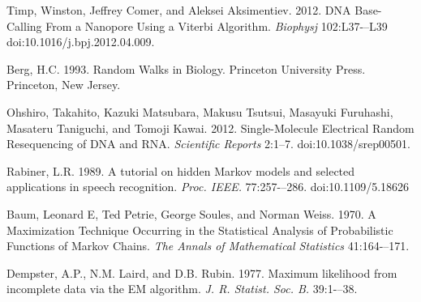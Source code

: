 \documentclass{biophys_letter}
\begin{document}
\begin{thebibliography}{99}
  Timp, Winston, Jeffrey Comer, and Aleksei Aksimentiev. 
  2012.
  DNA Base-Calling From a Nanopore Using a Viterbi Algorithm.
  {\it Biophysj}
  102:L37-–L39
  doi:10.1016/j.bpj.2012.04.009.

  Berg, H.C.
  1993.
  Random Walks in Biology.
  Princeton University Press.
  Princeton, New Jersey.

  Ohshiro, Takahito, Kazuki Matsubara, Makusu Tsutsui, Masayuki Furuhashi, Masateru Taniguchi, and Tomoji Kawai. 
  2012.
  Single-Molecule Electrical Random Resequencing of DNA and RNA.
  {\it Scientific Reports} 
  2:1--7.
  doi:10.1038/srep00501.

  Rabiner, L.R.
  1989.
  A tutorial on hidden Markov models and selected applications in speech recognition.
  {\it Proc. IEEE.}
  77:257-–286.
  doi:10.1109/5.18626

  Baum, Leonard E, Ted Petrie, George Soules, and Norman Weiss. 
  1970.
  A Maximization Technique Occurring in the Statistical Analysis of Probabilistic Functions of Markov Chains.
  {\it The Annals of Mathematical Statistics}
  41:164-–171.

  Dempster, A.P., N.M. Laird, and D.B. Rubin.
  1977.
  Maximum likelihood from incomplete data via the EM algorithm.
  {\it J. R. Statist. Soc. B.}
  39:1-–38.

\end{thebibliography}
\end{document}
